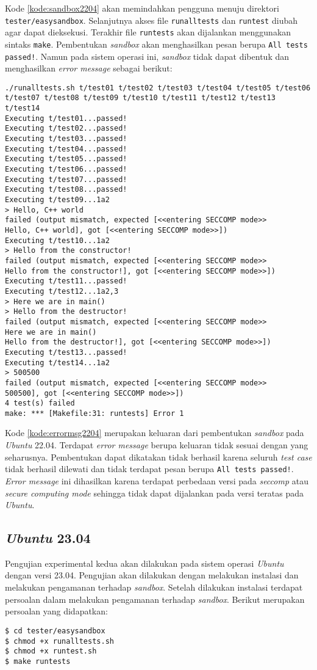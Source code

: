 Kode \ref{kode:sandbox2204} akan memindahkan pengguna menuju direktori \texttt{tester/easysandbox}. Selanjutnya akses file \texttt{runalltests} dan \texttt{runtest} diubah agar dapat dieksekusi. Terakhir file \texttt{runtests} akan dijalankan menggunakan sintaks \texttt{make}. Pembentukan \textit{sandbox} akan menghasilkan pesan berupa \texttt{All tests passed!}. Namun pada sistem operasi ini, \textit{sandbox} tidak dapat dibentuk dan menghasilkan \textit{error message} sebagai berikut:
\begin{lstlisting}[caption=\textit{Error message} pembangunan \textit{sandbox} pada \textit{Ubuntu} 22.04, label=kode:errormsg2204]
./runalltests.sh t/test01 t/test02 t/test03 t/test04 t/test05 t/test06 t/test07 t/test08 t/test09 t/test10 t/test11 t/test12 t/test13 t/test14
Executing t/test01...passed!
Executing t/test02...passed!
Executing t/test03...passed!
Executing t/test04...passed!
Executing t/test05...passed!
Executing t/test06...passed!
Executing t/test07...passed!
Executing t/test08...passed!
Executing t/test09...1a2
> Hello, C++ world
failed (output mismatch, expected [<<entering SECCOMP mode>>
Hello, C++ world], got [<<entering SECCOMP mode>>])
Executing t/test10...1a2
> Hello from the constructor!
failed (output mismatch, expected [<<entering SECCOMP mode>>
Hello from the constructor!], got [<<entering SECCOMP mode>>])
Executing t/test11...passed!
Executing t/test12...1a2,3
> Here we are in main()
> Hello from the destructor!
failed (output mismatch, expected [<<entering SECCOMP mode>>
Here we are in main()
Hello from the destructor!], got [<<entering SECCOMP mode>>])
Executing t/test13...passed!
Executing t/test14...1a2
> 500500
failed (output mismatch, expected [<<entering SECCOMP mode>>
500500], got [<<entering SECCOMP mode>>])
4 test(s) failed
make: *** [Makefile:31: runtests] Error 1
\end{lstlisting}
Kode \ref{kode:errormsg2204} merupakan keluaran dari pembentukan \textit{sandbox} pada \textit{Ubuntu} 22.04. Terdapat \textit{error message} berupa keluaran tidak sesuai dengan yang seharusnya. Pembentukan dapat dikatakan tidak berhasil karena seluruh \textit{test case} tidak berhasil dilewati dan tidak terdapat pesan berupa \texttt{All tests passed!}. \textit{Error message} ini dihasilkan karena terdapat perbedaan versi pada \textit{seccomp} atau \textit{secure computing mode} sehingga tidak dapat dijalankan pada versi teratas pada \textit{Ubuntu}.

\subsection{\textit{Ubuntu} 23.04}
Pengujian experimental kedua akan dilakukan pada sistem operasi \textit{Ubuntu} dengan versi 23.04. Pengujian akan dilakukan dengan melakukan instalasi dan melakukan pengamanan terhadap \textit{sandbox}. Setelah dilakukan instalasi terdapat persoalan dalam melakukan pengamanan terhadap \textit{sandbox}. Berikut merupakan persoalan yang didapatkan:
\begin{lstlisting}[caption=Pembangunan \textit{sandbox} pada \textit{Ubuntu} 23.04, label=kode:sandbox2304]
$ cd tester/easysandbox
$ chmod +x runalltests.sh
$ chmod +x runtest.sh
$ make runtests
\end{lstlisting}

